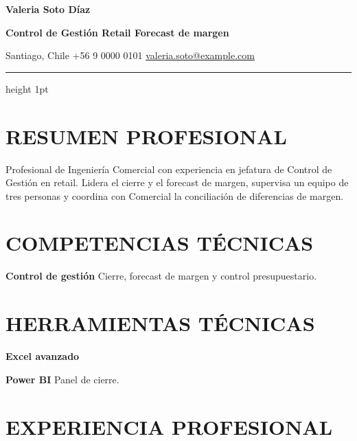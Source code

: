 \documentclass[10pt,a4paper]{article}
\newcommand{\detalle}[2]{%
    \noindent
    \textbf{#1} #2\par
    \vspace{2pt}
}
\begin{document}
\fontsize{9.2}{11}\selectfont
\color{texto}

\begin{center}
    {\fontsize{23}{27}\selectfont
     \bfseries\color{principal}Valeria Soto Díaz\par}

    \vspace{4pt}

    {\fontsize{9.5}{12}\selectfont
     \bfseries Control de Gestión \textbar{} Retail \textbar{} Forecast de margen \par}

    \vspace{5pt}

    {\fontsize{8.5}{10.5}\selectfont\color{secundario}
     Santiago, Chile \textbullet{} +56 9 0000 0101 \textbullet{}
     \href{mailto:valeria.soto@example.com}{valeria.soto@example.com}\par}
\end{center}

\vspace{-3pt}
{\color{principal}\hrule height 1pt}
\vspace{2pt}

\section{RESUMEN PROFESIONAL}

Profesional de Ingeniería Comercial con experiencia en jefatura de Control de Gestión
en retail. Lidera el cierre y el forecast de margen, supervisa un equipo de tres
personas y coordina con Comercial la conciliación de diferencias de margen.

\section{COMPETENCIAS TÉCNICAS}

\detalle{Control de gestión}{Cierre, forecast de margen y control presupuestario.}

\section{HERRAMIENTAS TÉCNICAS}

\noindent\textbf{Excel avanzado}\par\vspace{2pt}
\detalle{Power BI}{Panel de cierre.}

\section{EXPERIENCIA PROFESIONAL}
\end{document}
